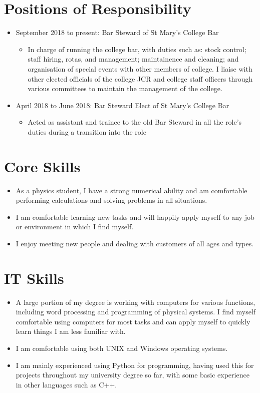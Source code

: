 \documentclass[10pt, a4paper]{article}
\begin{document}
\section{Positions of Responsibility}
\begin{itemize}
    \item September 2018 to present: Bar Steward of St Mary's College Bar
        \begin{itemize}
            \item In charge of running the college bar, with duties such as: stock control; staff hiring, rotas, and management; maintainence and cleaning; and organisation of special events with other members of college. 
                I liaise with other elected officials of the college JCR and college staff officers through various committees to maintain the management of the college.
        \end{itemize}
    \item April 2018 to June 2018: Bar Steward Elect of St Mary's College Bar
        \begin{itemize}
            \item Acted as assistant and trainee to the old Bar Steward in all the role's duties during a transition into the role
        \end{itemize}
\end{itemize}

\section{Core Skills}
\begin{itemize}
	\item As a physics student, I have a strong numerical ability and am comfortable performing calculations and solving problems in all situations.
	\item I am comfortable learning new tasks and will happily apply myself to any job or environment in which I find myself.
	\item I enjoy meeting new people and dealing with customers of all ages and types.
\end{itemize}

\section{IT Skills}
\begin{itemize}
    \item A large portion of my degree is working with computers for various functions, including word processing and programming of physical systems.
        I find myself comfortable using computers for most tasks and can apply myself to quickly learn things I am less familiar with. 
    \item I am comfortable using both UNIX and Windows operating systems. 
    \item I am mainly experienced using Python for programming, having used this for projects throughout my university degree so far, with some basic experience in other languages such as C++.
\end{itemize}
\end{document}
